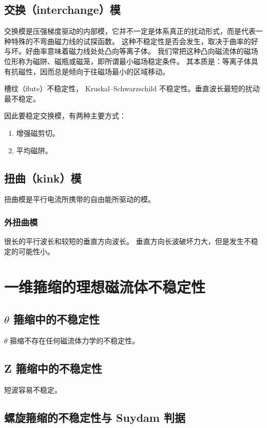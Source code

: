 \subsection{交换（interchange）模}

交换模是压强梯度驱动的内部模，它并不一定是体系真正的扰动形式，而是代表一种特殊的不弯曲磁力线的试探函数。
这种不稳定性是否会发生，取决于曲率的好与坏。好曲率意味着磁力线处处凸向等离子体。
我们常把这种凸向磁流体的磁场位形称为磁阱、磁瓶或磁笼，即所谓最小磁场稳定条件。
其本质是：等离子体具有抗磁性，因而总是倾向于往磁场最小的区域移动。

槽纹（flute）不稳定性， Kruskal–Schwarzschild 不稳定性。垂直波长最短的扰动最不稳定。

因此要稳定交换模，有两种主要方式：
\begin{enumerate}
    \item 增强磁剪切。
    \item 平均磁阱。
\end{enumerate}

\subsection{ 扭曲（kink）模}

扭曲模是平行电流所携带的自由能所驱动的模。

\subsubsection{外扭曲模}

很长的平行波长和较短的垂直方向波长。
垂直方向长波破坏力大，但是发生不稳定的可能性小。

\section{一维箍缩的理想磁流体不稳定性}

\subsection{\texorpdfstring{$\theta$}{theta} 箍缩中的不稳定性}

$\theta$ 箍缩不存在任何磁流体力学的不稳定性。

\subsection{Z 箍缩中的不稳定性}

短波容易不稳定。

\subsection{螺旋箍缩的不稳定性与 Suydam 判据}
